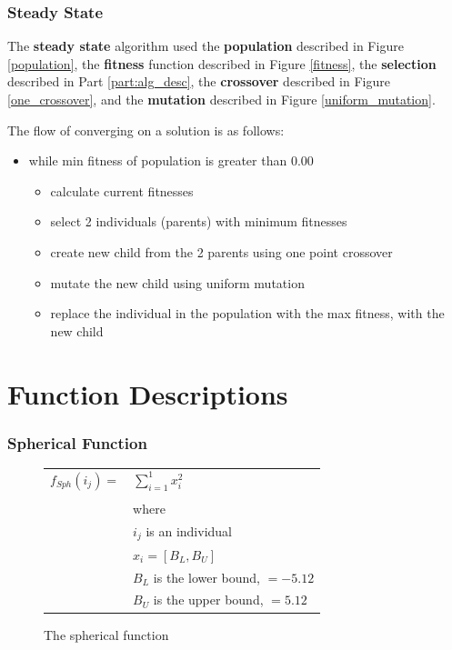 \documentclass[12pt]{article}
\begin{document}
\section{Steady State}
The \textbf{steady state} algorithm used the \textbf{population} described in Figure \ref{population}, the \textbf{fitness} function described in Figure \ref{fitness}, the \textbf{selection} described in Part \ref{part:alg_desc}, the \textbf{crossover} described in Figure \ref{one_crossover}, and the \textbf{mutation} described in Figure \ref{uniform_mutation}.

The flow of converging on a solution is as follows:
\begin{itemize}
	\item while min fitness of population is greater than 0.00
	\begin{itemize}
		\item calculate current fitnesses
		\item select 2 individuals (parents) with minimum fitnesses
		\item create new child from the 2 parents using one point crossover
		\item mutate the new child using uniform mutation
		\item replace the individual in the population with the max fitness, with the new child
	\end{itemize}
\end{itemize}


\part{Function Descriptions}
\label{part:func_defs}

\section{Spherical Function}
\begin{figure}[!h]
        \begin{center}
		\begin{tabular}{r l}
			$ f_{Sph}(i_j) = $			&	$ \sum_{i=1}^{1}x_i^2 $ \\
								& \\
								&	where \\
								&	$ i_j $ is an individual \\
								&	$ x_i = [B_L, B_U] $ \\
								& $ B_L $ is the lower bound, $ = -5.12 $\\
								& $ B_U $ is the upper bound, $ = 5.12 $\\

		\end{tabular} 
               \caption{The spherical function}
                \label{spherical}
        \end{center}
\end{figure}
\end{document}

